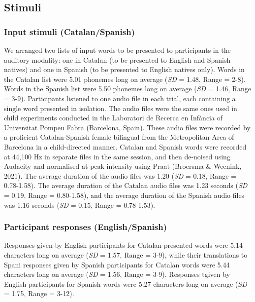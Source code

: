 \documentclass[
  english,
  man,floatsintext]{apa7}
\begin{document}
\hypertarget{stimuli}{%
\subsection{Stimuli}\label{stimuli}}

\hypertarget{input-stimuli-catalanspanish}{%
\subsubsection{Input stimuli (Catalan/Spanish)}\label{input-stimuli-catalanspanish}}

We arranged two lists of input words to be presented to participants in the auditory modality: one in Catalan (to be presented to English and Spanish natives) and one in Spanish (to be presented to English natives only). Words in the Catalan list were 5.01 phonemes long on average (\emph{SD} = 1.48, Range = 2-8). Words in the Spanish list were 5.50 phonemes long on average (\emph{SD} = 1.46, Range = 3-9). Participants listened to one audio file in each trial, each containing a single word presented in isolation. The audio files were the same ones used in child experiments conducted in the Laboratori de Recerca en Infància of Universitat Pompeu Fabra (Barcelona, Spain). These audio files were recorded by a proficient Catalan-Spanish female bilingual from the Metropolitan Area of Barcelona in a child-directed manner. Catalan and Spanish words were recorded at 44,100 Hz in separate files in the same session, and then de-noised using Audacity and normalised at peak intensity using Praat (Broersma \& Weenink, 2021). The average duration of the audio files was 1.20 (\emph{SD} = 0.18, Range = 0.78-1.58). The average duration of the Catalan audio files was 1.23 seconds (\emph{SD} = 0.19, Range = 0.80-1.58), and the average duration of the Spanish audio files was 1.16 seconds (\emph{SD} = 0.15, Range = 0.78-1.53).

\hypertarget{participant-responses-englishspanish}{%
\subsubsection{Participant responses (English/Spanish)}\label{participant-responses-englishspanish}}

Responses given by English participants for Catalan presented words were 5.14 characters long on average (\emph{SD} = 1.57, Range = 3-9), while their translations to Spani responses given by Spanish participants for Catalan words were 5.44 characters long on average (\emph{SD} = 1.56, Range = 3-9). Responses tgiven by English participants for Spanish words were 5.27 characters long on average (\emph{SD} = 1.75, Range = 3-12).
\end{document}
